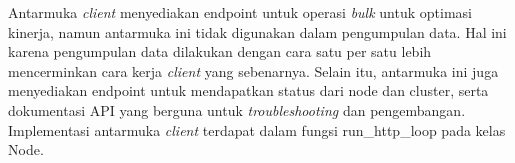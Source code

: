 Antarmuka \textit{client} menyediakan endpoint untuk operasi \textit{bulk} untuk optimasi kinerja, namun antarmuka ini tidak digunakan dalam pengumpulan data. Hal ini karena pengumpulan data dilakukan dengan cara satu per satu lebih mencerminkan cara kerja \textit{client} yang sebenarnya. Selain itu, antarmuka ini juga menyediakan endpoint untuk mendapatkan status dari node dan cluster, serta dokumentasi API yang berguna untuk \textit{troubleshooting} dan pengembangan. Implementasi antarmuka \textit{client} terdapat dalam fungsi run\_http\_loop pada kelas Node.
